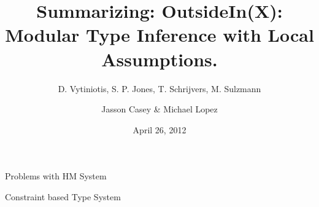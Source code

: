 \documentclass{beamer}
\title{Summarizing: OutsideIn(X): Modular Type Inference with Local Assumptions.}
\subtitle{D. Vytiniotis, S. P. Jones, T. Schrijvers, M. Sulzmann}
\author{Jasson Casey \& Michael Lopez}
\date{April 26, 2012}
\begin{document}
\begin{frame}
\titlepage
\end{frame}

\begin{frame}{Problems with HM System}
\end{frame}

\begin{frame}{Constraint based Type System}
\end{frame}
\end{document}
